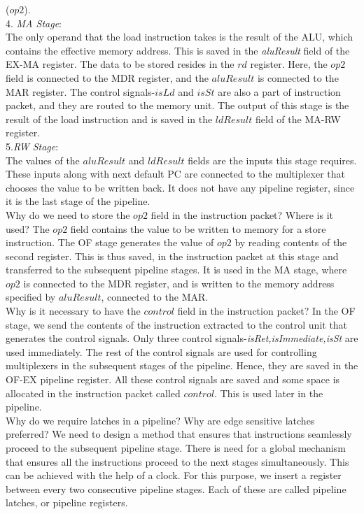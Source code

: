 \begin{ExerciseList}
($op2$). \\
4. \textit{MA Stage}: \\
The only operand that the load instruction takes is the result of the ALU, which contains the effective memory address. This is saved in the \textit{aluResult} field of the EX-MA register. The data to be stored resides in the $rd$ register. Here, the $op2$ field is connected to the MDR register, and the $aluResult$ is connected to the MAR register. The control signals-$isLd$ and $isSt$ are also a part of instruction packet, and they are routed to the memory unit. The output of this stage is the result of the load instruction and is saved in the $ldResult$ field of the MA-RW register. \\
5.\textit{RW Stage}: \\
The values of the $aluResult$ and $ldResult$ fields are the inputs this stage requires. These inputs along with next default PC are connected to the multiplexer that chooses the value to be written back. It does not have any pipeline register, since it is the last stage of the pipeline. \\
\Exercise
Why do we need to store the $op2$ field in the instruction packet? Where is it used?
\Answer
The $op2$ field contains the value to be written to memory for a store instruction. The OF stage generates the value of $op2$ by reading contents of the second register. This is thus saved, in the instruction packet at this stage and transferred to the subsequent pipeline stages. It is used in the MA stage, where $op2$ is connected to the MDR register, and is written to the memory address specified by $aluResult$, connected to the MAR. \\
\Exercise
Why is it necessary to have the $control$ field in the instruction packet?
\Answer
In the OF stage, we send the contents of the instruction extracted to the control unit that generates the control signals. Only three control signals-\textit{isRet,isImmediate,isSt} are used immediately. The rest of the control signals are used for controlling multiplexers in the subsequent stages of the pipeline. Hence, they are saved in the OF-EX pipeline register. All these control signals are saved and some space is allocated in the instruction packet called $control$. This is used later in the pipeline. \\
\Exercise
Why do we require latches in a pipeline? Why are edge sensitive latches preferred?
\Answer
We need to design a method that ensures that instructions seamlessly proceed to the subsequent pipeline stage. There is need for a global mechanism that ensures all the instructions proceed to the next stages simultaneously. This can be achieved with the help of a clock. For this purpose, we insert a register between every two consecutive pipeline stages. Each of these are called pipeline latches, or pipeline registers. \\

\end{ExerciseList}
